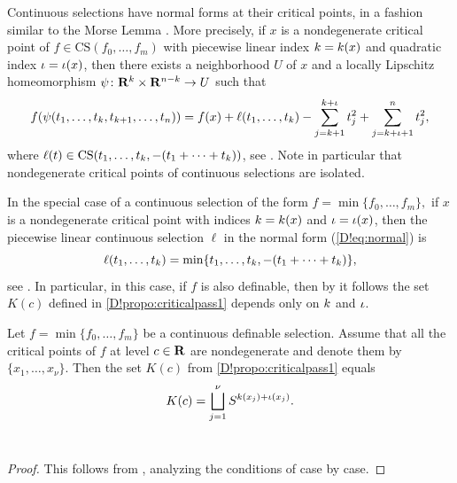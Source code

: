 \begin{remark}
\label{D!rmk:normalformdist1}
  Continuous selections have normal forms at their critical points, in a fashion similar to the Morse Lemma \cite[Lemma~2.2]{Milnor1963}. More precisely, if $x$ is a nondegenerate critical point of $f\in \mathrm{CS}(f_0, \ldots, f_m)$ with piecewise linear index $k = k(x)$ and quadratic index $\iota = \iota(x)$, then there exists a neighborhood $U$ of $x$ and a locally Lipschitz homeomorphism $\psi\colon\mathbf{R}^k \times \mathbf{R}^{n - k} \to U$ such that
  \begin{equation}
  \label{D!eq:normal}
    f(\psi(t_1, \ldots, t_k, t_{k+1}, \ldots, t_{n}))=f(x)+\ell(t_1, \ldots, t_k)-\sum_{j=k+1}^{k + \iota} t_{j}^2 + \sum_{j = k + \iota + 1}^n t_j^2,
  \end{equation}
  where $\ell(t) \in \mathrm{CS}(t_1, \ldots, t_k, -(t_1 + \cdots + t_k))$, see \cite[Theorem 3.3]{JongenPallaschke1988}. Note in particular that nondegenerate critical points of continuous selections are isolated.
\end{remark}

In the special case of a continuous selection of the form $f=\min\{f_0, \ldots, f_m\},$ if $x$ is a nondegenerate critical point with indices $k = k(x)$ and $\iota = \iota(x)$, then 
the piecewise linear continuous selection $\ell$ in the normal form  (\ref{D!eq:normal}) is
\[
  \ell(t_1, \ldots, t_k) = \min \{ t_1, \ldots, t_k, -(t_1 + \cdots + t_k)\},
\]
see \cite[Theorem~3.3]{JongenPallaschke1988}.
In particular, in this case, if $f$ is also definable, then by \cite[Sect.~4]{APS1997} it follows the set $K(c)$ defined in \cref{D!propo:criticalpass1} depends only on $k$ and $\iota$.

\begin{proposition}
\label{D!propo:passmin}
  Let $f=\min\{f_0, \ldots, f_m\}$ be a continuous definable selection. Assume that all the critical points of $f$ at level $c\in \mathbf{R}$ are nondegenerate and denote them by $\{x_1, \ldots, x_\nu\}$. Then the set $K(c)$ from \cref{D!propo:criticalpass1} equals
  $$K(c) = \bigsqcup_{j=1}^\nu S^{k(x_j) + \iota(x_j)}.$$\
\end{proposition}

\begin{proof}
  This follows from \cite[Sect.~4]{APS1997}, analyzing the conditions of \cite[Theorem 4.2]{APS1997} case by case.
\end{proof}

